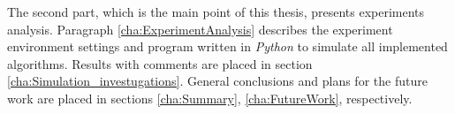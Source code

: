 The second part, which is the main point of this thesis, presents experiments analysis.
Paragraph \ref{cha:ExperimentAnalysis} describes the experiment environment
settings and program written in \textit{Python} to simulate all implemented
algorithms.  Results with comments are placed in
section \ref{cha:Simulation_investugations}. General
conclusions and plans for the future work are placed in sections
\ref{cha:Summary}, \ref{cha:FutureWork}, respectively. 

